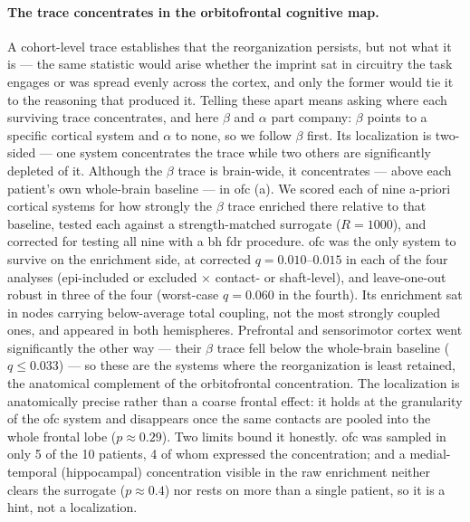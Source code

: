 \paragraph{The trace concentrates in the orbitofrontal cognitive map.}
A cohort-level trace establishes that the reorganization persists, but not what it is --- the same statistic would arise whether the imprint sat in circuitry the task engages or was spread evenly across the cortex, and only the former would tie it to the reasoning that produced it. Telling these apart means asking where each surviving trace concentrates, and here \(\beta\) and \(\alpha\) part company: \(\beta\) points to a specific cortical system and \(\alpha\) to none, so we follow \(\beta\) first. Its localization is two-sided --- one system concentrates the trace while two others are significantly depleted of it. Although the \(\beta\) trace is brain-wide, it concentrates --- above each patient's own whole-brain baseline --- in \gls{ofc} (a). We scored each of nine a-priori cortical systems for how strongly the \(\beta\) trace enriched there relative to that baseline, tested each against a strength-matched surrogate (\(R = 1000\)), and corrected for testing all nine with a \gls{bh} \gls{fdr} procedure. \gls{ofc} was the only system to survive on the enrichment side, at corrected \(q = 0.010\)--\(0.015\) in each of the four analyses (epi-included or excluded \(\times\) contact- or shaft-level), and leave-one-out robust in three of the four (worst-case \(q = 0.060\) in the fourth). Its enrichment sat in nodes carrying below-average total coupling, not the most strongly coupled ones, and appeared in both hemispheres. Prefrontal and sensorimotor cortex went significantly the other way --- their \(\beta\) trace fell below the whole-brain baseline (\(q \le 0.033\)) --- so these are the systems where the reorganization is least retained, the anatomical complement of the orbitofrontal concentration. The localization is anatomically precise rather than a coarse frontal effect: it holds at the granularity of the \gls{ofc} system and disappears once the same contacts are pooled into the whole frontal lobe (\(p \approx 0.29\)). Two limits bound it honestly. \gls{ofc} was sampled in only 5 of the 10 patients, 4 of whom expressed the concentration; and a medial-temporal (hippocampal) concentration visible in the raw enrichment neither clears the surrogate (\(p \approx 0.4\)) nor rests on more than a single patient, so it is a hint, not a localization.

